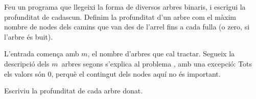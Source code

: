 


\Statement

Feu un programa que llegeixi la forma de diversos arbres binaris,
i escrigui la profunditat de cadascun.
Definim la profunditat d'un arbre
com el màxim nombre de nodes
dels camins que van des de l'arrel fins a cada fulla
(o zero, si l'arbre és buit).



\Input

L'entrada comença amb $m$, el nombre d'arbres que cal tractar. Segueix la
descripció dels $m$~arbres segons s'explica al problema , 
amb una excepció: Tots els valors són 0, perquè el
contingut dels nodes aquí no és important.


\Output

Escriviu la profunditat de cada arbre donat.



\SampleOneCol
